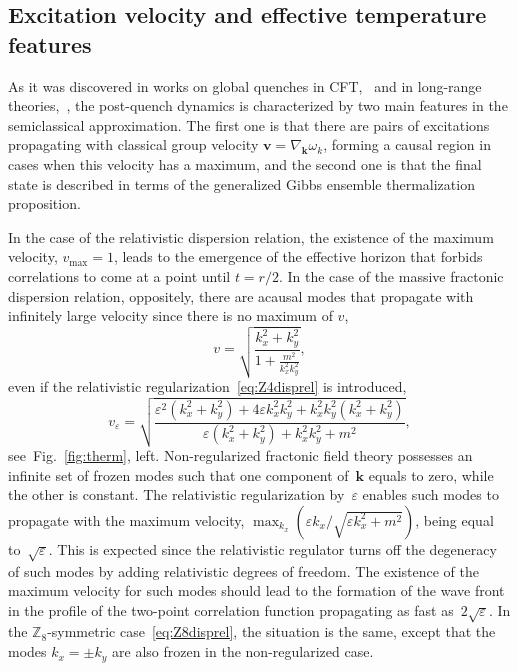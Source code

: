 \documentclass[a4paper,12pt]{article}
\newcommand{\be}{\begin{equation}}
\newcommand{\ee}{\end{equation}}
\newcommand{\skipline}{\vspace{\baselineskip}}
\newcommand{\eps}{\varepsilon}
\newcommand{\om}{\omega}
\newcommand{\Z}[1]{\mathbb{Z}_{#1}}
\newcommand{\figref}[1]{Fig.~\ref{#1}}
\begin{document}
\subsection*{Excitation velocity and effective temperature features}

As it was discovered in works on global quenches in CFT,~\cite{Calabrese:2007rg} and in long-range theories,~\cite{Rajabpour:2014osa}, the post-quench dynamics is characterized by two main features in the semiclassical approximation. The first one is that there are pairs of excitations propagating with classical group velocity $\mathbf{v} = \nabla_\mathbf{k}\om_k$, forming a causal region in cases when this velocity has a maximum, and the second one is that the final state is described in terms of the generalized Gibbs ensemble thermalization proposition.

\skipline

In the case of the relativistic dispersion relation, the existence of the maximum velocity, $v_\text{max} = 1$, leads to the emergence of the effective horizon that forbids correlations to come at a point until $t = r/2$. In the case of the massive fractonic dispersion relation, oppositely, there are acausal modes that propagate with infinitely large velocity since there is no maximum of $v$,
\be
    v = \sqrt{\frac{k_x^2 + k_y^2}{1 + \displaystyle\frac{m^2}{k_x^2 k_y^2}}},
\ee
even if the relativistic regularization~\eqref{eq:Z4disprel} is introduced,
\be
    v_{\eps} = \sqrt{\frac{\eps^2\left(k_x^2 + k_y^2\right) + 4\eps k_x^2k_y^2 + k_x^2k_y^2\left(k_x^2 + k_y^2\right)}{\eps\left(k_x^2 + k_y^2\right) + k_x^2k_y^2 + m^2}},
    \label{eq:vel}
\ee
see~\figref{fig:therm}, left. Non-regularized fractonic field theory possesses an infinite set of frozen modes such that one component of~$\mathbf{k}$ equals to zero, while the other is constant. The relativistic regularization by~$\eps$ enables such modes to propagate with the maximum velocity, $\max_{k_x}(\eps k_x/\sqrt{\eps k_x^2 + m^2})$, being equal to~$\sqrt{\eps}$. This is expected since the relativistic regulator turns off the degeneracy of such modes by adding relativistic degrees of freedom. The existence of the maximum velocity for such modes should lead to the formation of the wave front in the profile of the two-point correlation function propagating as fast as~$2\sqrt{\eps}$. In the $\Z8$-symmetric case~\eqref{eq:Z8disprel}, the situation is the same, except that the modes $k_x = \pm k_y$ are also frozen in the non-regularized case.

\skipline
\end{document}
